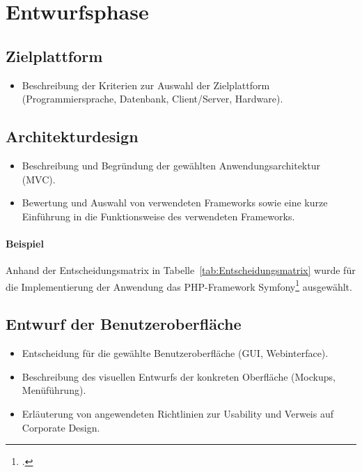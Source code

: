 \section{Entwurfsphase} 
\label{sec:Entwurfsphase}

\subsection{Zielplattform}
\label{sec:Zielplattform}

\begin{itemize}
	\item Beschreibung der Kriterien zur Auswahl der Zielplattform (\ua Programmiersprache, Datenbank, Client/Server, Hardware).
\end{itemize}


\subsection{Architekturdesign}
\label{sec:Architekturdesign}
\begin{itemize}
	\item Beschreibung und Begründung der gewählten Anwendungsarchitektur (\zB \acs{MVC}).
	\item \Ggfs Bewertung und Auswahl von verwendeten Frameworks sowie \ggfs eine kurze Einführung in die Funktionsweise des verwendeten Frameworks.
\end{itemize}

\paragraph{Beispiel}
Anhand der Entscheidungsmatrix in Tabelle~\ref{tab:Entscheidungsmatrix} wurde für die Implementierung der Anwendung das \acs{PHP}-Framework Symfony\footnote{\Vgl \citet{Symfony}.} ausgewählt. 



\subsection{Entwurf der Benutzeroberfläche}
\label{sec:Benutzeroberflaeche} 
\begin{itemize}
	\item Entscheidung für die gewählte Benutzeroberfläche (\zB GUI, Webinterface).
	\item Beschreibung des visuellen Entwurfs der konkreten Oberfläche (\zB Mockups, Menüführung).
	\item \Ggfs Erläuterung von angewendeten Richtlinien zur Usability und Verweis auf Corporate Design.
\end{itemize}

